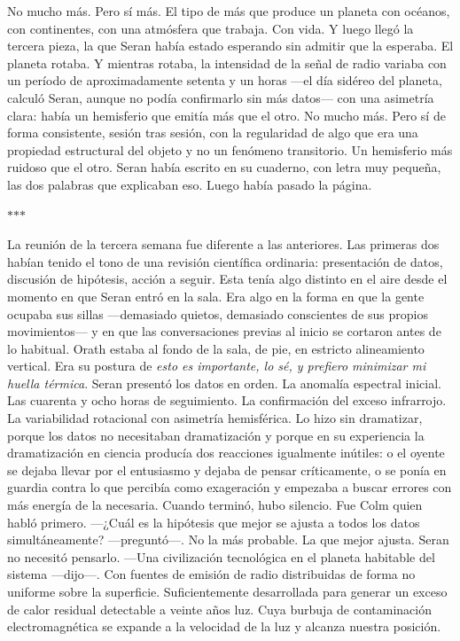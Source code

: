 \documentclass[11pt,a5paper,twoside]{book}
\begin{document}
No mucho más. Pero sí más.
El tipo de más que produce un planeta con océanos, con continentes, con una atmósfera que trabaja. Con vida.
Y luego llegó la tercera pieza, la que Seran había estado esperando sin admitir que la esperaba.
El planeta rotaba. Y mientras rotaba, la intensidad de la señal de radio variaba con un período de aproximadamente setenta y un horas —el día sidéreo del planeta, calculó Seran, aunque no podía confirmarlo sin más datos— con una asimetría clara: había un hemisferio que emitía más que el otro. No mucho más. Pero sí de forma consistente, sesión tras sesión, con la regularidad de algo que era una propiedad estructural del objeto y no un fenómeno transitorio.
Un hemisferio más ruidoso que el otro.
Seran había escrito en su cuaderno, con letra muy pequeña, las dos palabras que explicaban eso. Luego había pasado la página.
\vspace{1.5em}
\begin{center}$\ast$\quad$\ast$\quad$\ast$\end{center}
\vspace{1.5em}
La reunión de la tercera semana fue diferente a las anteriores.
Las primeras dos habían tenido el tono de una revisión científica ordinaria: presentación de datos, discusión de hipótesis, acción a seguir. Esta tenía algo distinto en el aire desde el momento en que Seran entró en la sala. Era algo en la forma en que la gente ocupaba sus sillas —demasiado quietos, demasiado conscientes de sus propios movimientos— y en que las conversaciones previas al inicio se cortaron antes de lo habitual.
Orath estaba al fondo de la sala, de pie, en estricto alineamiento vertical. Era su postura de \textit{esto es importante, lo sé, y prefiero minimizar mi huella térmica}.
Seran presentó los datos en orden. La anomalía espectral inicial. Las cuarenta y ocho horas de seguimiento. La confirmación del exceso infrarrojo. La variabilidad rotacional con asimetría hemisférica. Lo hizo sin dramatizar, porque los datos no necesitaban dramatización y porque en su experiencia la dramatización en ciencia producía dos reacciones igualmente inútiles: o el oyente se dejaba llevar por el entusiasmo y dejaba de pensar críticamente, o se ponía en guardia contra lo que percibía como exageración y empezaba a buscar errores con más energía de la necesaria.
Cuando terminó, hubo silencio.
Fue Colm quien habló primero.
—¿Cuál es la hipótesis que mejor se ajusta a todos los datos simultáneamente? —preguntó—. No la más probable. La que mejor ajusta.
Seran no necesitó pensarlo.
—Una civilización tecnológica en el planeta habitable del sistema —dijo—. Con fuentes de emisión de radio distribuidas de forma no uniforme sobre la superficie. Suficientemente desarrollada para generar un exceso de calor residual detectable a veinte años luz. Cuya burbuja de contaminación electromagnética se expande a la velocidad de la luz y alcanza nuestra posición.
\end{document}
